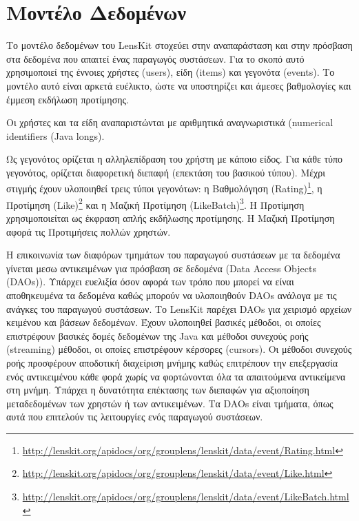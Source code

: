 \section{Μοντέλο Δεδομένων}
Το μοντέλο δεδομένων του {\en LensKit} στοχεύει στην αναπαράσταση και στην πρόσβαση στα δεδομένα που απαιτεί ένας παραγωγός συστάσεων. Για το σκοπό αυτό χρησιμοποιεί της έννοιες χρήστες ({\en users}), είδη ({\en items}) και γεγονότα ({\en events}). Το μοντέλο αυτό είναι αρκετά ευέλικτο, ώστε να υποστηρίζει και άμεσες βαθμολογίες και έμμεση εκδήλωση προτίμησης. \par
Οι χρήστες και τα είδη αναπαριστώνται με αριθμητικά αναγνωριστικά ({\en numerical identifiers (Java longs)}. \par
Ως γεγονότος ορίζεται η αλληλεπίδραση του χρήστη με κάποιο είδος. Για κάθε τύπο γεγονότος, ορίζεται διαφορετική διεπαφή (επεκτάση του βασικού τύπου). Μέχρι στιγμής έχουν υλοποιηθεί τρεις τύποι γεγονότων: η Βαθμολόγηση ({\en Rating})\footnote{\en \url{http://lenskit.org/apidocs/org/grouplens/lenskit/data/event/Rating.html}}, η Προτίμηση ({\en Like})\footnote{\en \url{http://lenskit.org/apidocs/org/grouplens/lenskit/data/event/Like.html}} και η Μαζική Προτίμηση ({\en LikeBatch})\footnote{\en \url{http://lenskit.org/apidocs/org/grouplens/lenskit/data/event/LikeBatch.html}}. Η Προτίμηση χρησιμοποιείται ως έκφραση απλής εκδήλωσης προτίμησης. Η Μαζική Προτίμηση αφορά τις Προτιμήσεις πολλών χρηστών. \par
Η επικοινωνία των διαφόρων τμημάτων του παραγωγού συστάσεων με τα δεδομένα γίνεται μεσω αντικειμένων για πρόσβαση σε δεδομένα ({\en Data Access Objects (DAOs))}. Υπάρχει ευελιξία όσον αφορά των τρόπο που μπορεί να είναι αποθηκευμένα τα δεδομένα καθώς μπορούν να υλοποιηθούν {\en DAOs} ανάλογα με τις ανάγκες του παραγωγού συστάσεων. Το {\en LensKit} παρέχει {\en DAOs} για χειρισμό αρχείων κειμένου και βάσεων δεδομένων. Έχουν υλοποιηθεί βασικές μέθοδοι, οι οποίες επιστρέφουν βασικές δομές δεδομένων της {\en Java} και μέθοδοι συνεχούς ροής ({\en streaming}) μέθοδοι, οι οποίες επιστρέφουν κέρσορες ({\en cursors}). Οι μέθοδοι συνεχούς ροής προσφέρουν αποδοτική διαχείριση μνήμης καθώς επιτρέπουν την επεξεργασία ενός αντικειμένου κάθε φορά χωρίς να φορτώνονται όλα τα απαιτούμενα αντικείμενα στη μνήμη. Υπάρχει η δυνατότητα επέκτασης των διεπαφών για αξιοποίηση μεταδεδομένων των χρηστών ή των αντικειμένων. Τα \en DAOs \el είναι τμήματα, όπως αυτά που επιτελούν τις λειτουργίες ενός παραγωγού συστάσεων.
